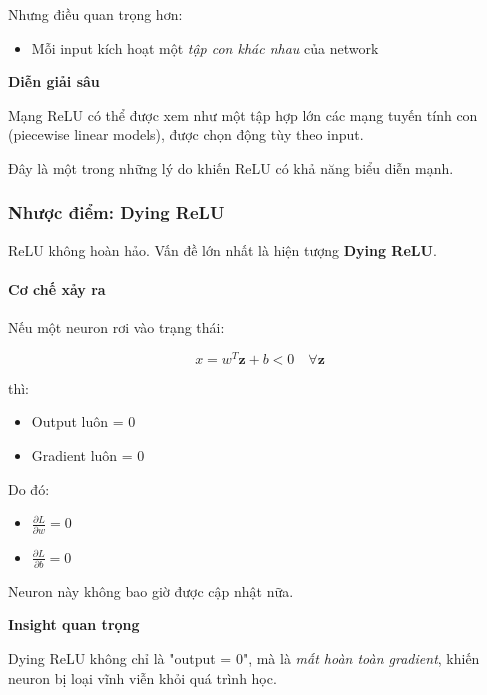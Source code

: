 Nhưng điều quan trọng hơn:

\begin{itemize}
	\item Mỗi input kích hoạt một \textit{tập con khác nhau} của network
\end{itemize}

\begin{mdframed}[style=infobox]
	\textbf{Diễn giải sâu}
	
	Mạng ReLU có thể được xem như một tập hợp lớn các mạng tuyến tính con (piecewise linear models), được chọn động tùy theo input.
\end{mdframed}

Đây là một trong những lý do khiến ReLU có khả năng biểu diễn mạnh.

\subsubsection*{Nhược điểm: Dying ReLU}

ReLU không hoàn hảo. Vấn đề lớn nhất là hiện tượng \textbf{Dying ReLU}.

\paragraph{Cơ chế xảy ra}

Nếu một neuron rơi vào trạng thái:

\[
x = w^T \mathbf{z} + b < 0 \quad \forall \mathbf{z}
\]

thì:

\begin{itemize}
	\item Output luôn = 0
	\item Gradient luôn = 0
\end{itemize}

Do đó:

\begin{itemize}
	\item $\frac{\partial L}{\partial w} = 0$
	\item $\frac{\partial L}{\partial b} = 0$
\end{itemize}

Neuron này không bao giờ được cập nhật nữa.

\begin{mdframed}[style=infobox]
	\textbf{Insight quan trọng}
	
	Dying ReLU không chỉ là "output = 0", mà là \textit{mất hoàn toàn gradient}, khiến neuron bị loại vĩnh viễn khỏi quá trình học.
\end{mdframed}

